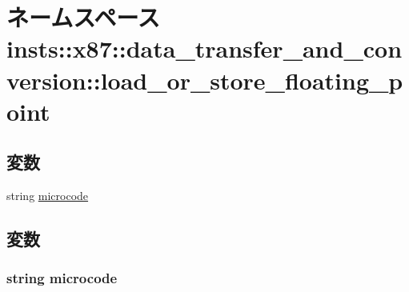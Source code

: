 \hypertarget{namespaceinsts_1_1x87_1_1data__transfer__and__conversion_1_1load__or__store__floating__point}{
\section{ネームスペース insts::x87::data\_\-transfer\_\-and\_\-conversion::load\_\-or\_\-store\_\-floating\_\-point}
\label{namespaceinsts_1_1x87_1_1data__transfer__and__conversion_1_1load__or__store__floating__point}
}
\subsection*{変数}
\begin{DoxyCompactItemize}
\item 
string \hyperlink{namespaceinsts_1_1x87_1_1data__transfer__and__conversion_1_1load__or__store__floating__point_a770f11a173e99389a8802f0107ed8f52}{microcode}
\end{DoxyCompactItemize}


\subsection{変数}
\hypertarget{namespaceinsts_1_1x87_1_1data__transfer__and__conversion_1_1load__or__store__floating__point_a770f11a173e99389a8802f0107ed8f52}{
\subsubsection[{microcode}]{\setlength{\rightskip}{0pt plus 5cm}string {\bf microcode}}}
\label{namespaceinsts_1_1x87_1_1data__transfer__and__conversion_1_1load__or__store__floating__point_a770f11a173e99389a8802f0107ed8f52}
